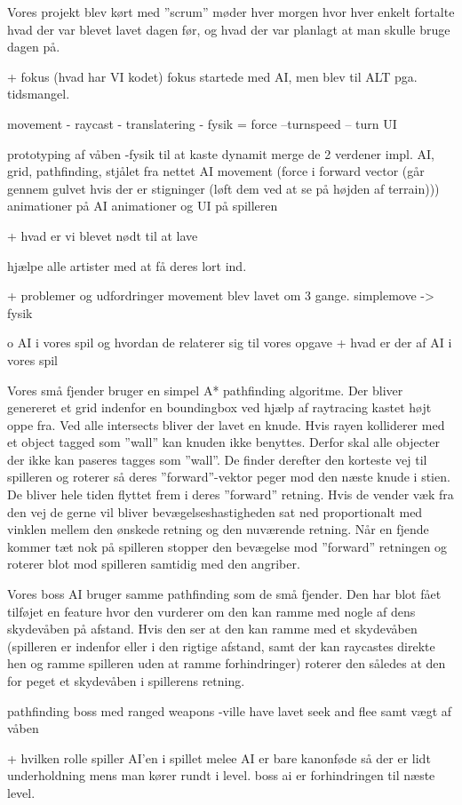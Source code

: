 Vores projekt blev kørt med ''scrum'' møder hver morgen hvor hver enkelt fortalte hvad der var blevet  lavet dagen før, og hvad der var planlagt at man skulle bruge dagen på.




                + fokus (hvad har VI kodet)
fokus startede med AI, men blev til ALT pga. tidsmangel.

movement
- raycast
- translatering
- fysik = force
--turnspeed
-- turn UI

prototyping af våben
-fysik til at kaste dynamit
merge de 2 verdener
impl. AI, grid, pathfinding, stjålet fra nettet
AI movement (force i forward vector (går gennem gulvet hvis der er stigninger (løft dem ved at se på højden af terrain)))
animationer på AI
animationer og UI på spilleren


                + hvad er vi blevet nødt til at lave

hjælpe alle artister med at få deres lort ind.

                + problemer og udfordringer
movement blev lavet om 3 gange.
simplemove -> fysik

          o AI i vores spil og hvordan de relaterer sig til vores opgave
                + hvad er der af AI i vores spil

Vores små fjender bruger en simpel A* pathfinding algoritme. Der bliver genereret et grid indenfor en boundingbox ved hjælp af raytracing kastet højt oppe fra. Ved alle intersects bliver der lavet en knude. Hvis rayen kolliderer med et object tagged som ''wall'' kan knuden ikke benyttes. Derfor skal alle objecter der ikke kan paseres tagges som ''wall''.
De finder derefter den korteste vej til spilleren og roterer så deres ''forward''-vektor peger mod den næste knude i stien. De bliver hele tiden flyttet frem i deres ''forward'' retning. Hvis de vender væk fra den vej de gerne vil bliver bevægelseshastigheden sat ned proportionalt med vinklen mellem den ønskede retning og den nuværende retning.
Når en fjende kommer tæt nok på spilleren stopper den bevægelse mod ''forward'' retningen og roterer blot mod spilleren samtidig med den angriber. 

Vores boss AI bruger samme pathfinding som de små fjender. Den har blot fået tilføjet en feature hvor den vurderer om den kan ramme med nogle af dens skydevåben på afstand. Hvis den ser at den kan ramme med et skydevåben (spilleren er indenfor eller i den rigtige afstand, samt der kan raycastes direkte hen og ramme spilleren uden at ramme forhindringer) roterer den således at den for peget et skydevåben i spillerens retning.



pathfinding boss med ranged weapons
-ville have lavet seek and flee samt vægt af våben

                + hvilken rolle spiller AI’en i spillet
melee AI er bare kanonføde så der er lidt underholdning mens man kører rundt i level.
boss ai er forhindringen til næste level.
